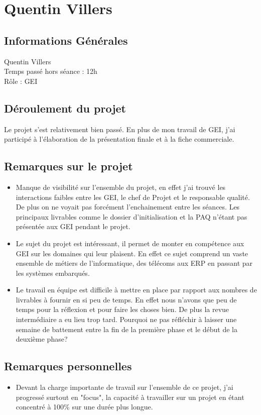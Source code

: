 \documentclass [a4paper] {report}
\begin{document}
\section*{Quentin Villers}

\subsection*{Informations Générales}

Quentin Villers \\
Temps passé hors séance : 12h \\
Rôle : GEI

\subsection*{Déroulement du projet}

Le projet s'est relativement bien passé. En plus de mon travail de GEI, j'ai 
participé à l'élaboration de la présentation finale et à la fiche commerciale.

\subsection*{Remarques sur le projet}
\begin{itemize}
\item Manque de visibilité sur l'ensemble du projet, en effet j'ai trouvé les
interactions faibles entre les GEI, le chef de Projet et le responsable qualité.
De plus on ne voyait pas forcément l'enchainement entre les séances.
Les principaux livrables comme le dossier d'initialisation et la PAQ n'étant pas
présentée aux GEI pendant le projet. 
\item Le sujet du projet est intéressant, il permet de monter en compétence aux GEI sur
les domaines qui leur plaisent. En effet ce sujet comprend un vaste ensemble de métiers
de l'informatique, des télécoms aux ERP en passant par les systèmes embarqués.
\item Le travail en équipe est difficile à mettre en place par rapport aux 
nombres de livrables à fournir en si peu de temps. En effet nous n'avons que peu 
de temps pour la réflexion et pour faire les choses bien. De plus la revue intermédiaire
a eu lieu trop tard. Pourquoi ne pas réfléchir à laisser une semaine de battement
entre la fin de la première phase et le début de la deuxième phase?
\end{itemize}

\subsection*{Remarques personnelles}
\begin{itemize}
\item Devant la charge importante de travail sur l'ensemble de ce projet, j'ai progressé
surtout en "focus", la capacité à travailler sur un projet en étant concentré à 100\%
sur une durée plus longue.

\end{itemize}
\end{document}
